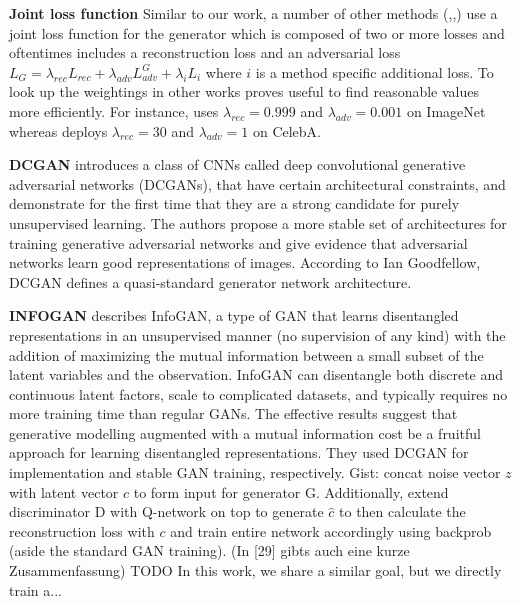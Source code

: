 \documentclass[12pt,a4paper]{article}
\begin{document}
\par \textbf{Joint loss function}
Similar to our work, a number of other methods (\cite{1511.05440},\cite{DisentFacOfVarByMixTh},\cite{1604.07379}) use a joint loss function for the generator which is composed of two or more losses and oftentimes includes a reconstruction loss and an adversarial loss $L_G = \lambda_{rec}L_{rec} + \lambda_{adv}L^G_{adv} + \lambda_{i}L_{i}$ where $i$ is a method specific additional loss. To look up the weightings in other works proves useful to find reasonable values more efficiently. For instance, \cite{1604.07379} uses $\lambda_{rec} = 0.999$ and $\lambda_{adv} = 0.001$ on ImageNet whereas \cite{DisentFacOfVarByMixTh} deploys $\lambda_{rec} = 30$ and $\lambda_{adv} = 1$ on CelebA.

\par \textbf{DCGAN} \cite{DCGAN} introduces a class of CNNs called deep convolutional generative adversarial networks (DCGANs), that have certain architectural constraints, and demonstrate for the first time that they are a strong candidate for purely unsupervised learning. The authors propose a more stable set of architectures for training generative adversarial networks and give evidence that adversarial networks learn good representations of images. According to Ian Goodfellow, DCGAN defines a quasi-standard generator network architecture. 

\par\textbf{INFOGAN} \cite{InfoGAN} describes InfoGAN, a type of GAN that learns disentangled representations in an unsupervised manner (no supervision of any kind) with the addition of maximizing the mutual information between a small subset of the latent variables and the observation. InfoGAN can disentangle both discrete and continuous latent factors, scale to complicated datasets, and typically requires no more training time than regular GANs.  The effective results suggest that generative modelling augmented with a mutual information cost be a fruitful approach for learning disentangled representations. They used DCGAN for implementation and stable GAN training, respectively. Gist: concat noise vector $z$ with latent vector $c$ to form input for generator G. Additionally, extend discriminator D with Q-network on top to generate $\hat{c}$ to then calculate the reconstruction loss with $c$ and train entire network accordingly using backprob (aside the standard GAN training). (In [29] gibts auch eine kurze Zusammenfassung) TODO In this work, we share a similar goal, but we
directly train a...
\end{document}
